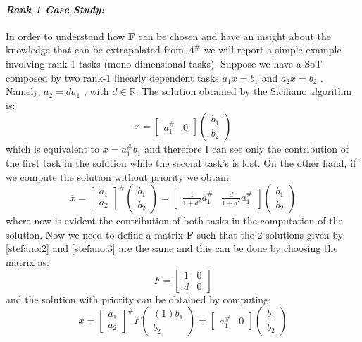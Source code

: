 \documentclass[12pt, a4paper]{article}
\newcommand{\R}{\mathbb{R}}
\begin{document}
\paragraph{\textit{Rank 1 Case Study:}}
In order to understand how \textbf{F} can be chosen and have an insight about the knowledge that can be extrapolated from $A^\#$  we will report a simple example involving rank-1 tasks (mono dimensional tasks).
Suppose we have a SoT composed by two rank-1 linearly dependent tasks $a_1x = b_1$ and $a_2x = b_2$ . Namely, $a_2 = da_1$ , with $d \in \R$.
The solution obtained by the Siciliano algorithm is:
\begin{equation}
\label{stefano:3}
x=\begin{bmatrix}
a_1^\# & 0 
\end{bmatrix}
\begin{pmatrix}
b_1 \\ b_2
\end{pmatrix}
\end{equation}
which is equivalent to $x = a_1^\#b_1$ and therefore I can see only the contribution of the first task in the solution while the second task’s is lost.
On the other hand, if we compute the solution without priority we obtain.
\[
\overline{x} = 
\begin{bmatrix}
a_1 \\ a_2
\end{bmatrix}^\#
\begin{pmatrix}
b_1 \\ b_2
\end{pmatrix} = 
\begin{bmatrix}
\frac{1}{1+d^2}a_1^\# & \frac{d}{1+d^2}a_1^\#
\end{bmatrix}
\begin{pmatrix}
b_1 \\ b_2
\end{pmatrix}
\]
where now is evident the contribution of both tasks in the computation of the solution.
Now we need to define a matrix \textbf{F}  such that the 2 solutions given by \eqref{stefano:2} and \eqref{stefano:3} are the same and this can be done by choosing the matrix as:
\[
F = \begin{bmatrix}
1 & 0 \\ d & 0
\end{bmatrix}
\]
and the solution with priority can be obtained by computing:
\[
x = 
\begin{bmatrix}
a_1 \\ a_2
\end{bmatrix}^\#F
\begin{pmatrix}(1)
b_1 \\ b_2
\end{pmatrix}
=\begin{bmatrix}
a_1^\# & 0 
\end{bmatrix}
\begin{pmatrix}
b_1 \\ b_2
\end{pmatrix}
\]
\end{document}
